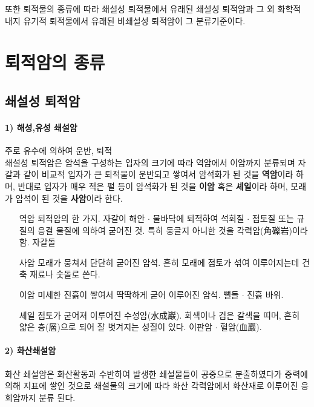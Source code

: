 \documentclass[12pt, a4paper, twoside]{book}
\begin{document}
		또한 퇴적물의 종류에 따라 쇄설성 퇴적물에서 유래된 쇄설성 퇴적암과 
		그 외 화학적 내지 유기적 퇴적물에서 유래된 비쇄설성 퇴적암이 그 분류기준이다.




	\clearpage
	\section{퇴적암의 종류}
	
	
				
		\subsection{쇄설성 퇴적암}


			\paragraph{1) 해성,유성 쇄설암}
				주로 유수에 의하여 운반, 퇴적 \\

				쇄설성 퇴적암은 암석을 구성하는 입자의 크기에 따라 역암에서 이암까지 분류되며 
				자갈과 같이 비교적 입자가 큰 퇴적물이 운반되고 쌓여서 암석화가 된 것을 \textbf{역암}이라 하며,
				반대로 입자가 매우 적은 펄 등이 암석화가 된 것을 \textbf{이암} 혹은 \textbf{셰일}이라 하며, 
				모래가 암석이 된 것을 \textbf{사암}이라 한다.

				\begin{itemize}[topsep=0.0em, parsep=0.0em, itemsep=0em, leftmargin=6.0em, labelwidth=3em, labelsep=3em] 
				\item [역암]	퇴적암의 한 가지. 자갈이 해안 $\cdot$ 물바닥에 퇴적하여 석회질 $\cdot$ 점토질 또는 규질의 응결 물질에 의하여 굳어진 것. 
							특히 둥글지 아니한 것을 각력암(角礫岩)이라 함. 자갈돌 
				\item [사암]  	모래가 뭉쳐서 단단히 굳어진 암석. 흔히 모래에 점토가 섞여 이루어지는데 건축 재료나 숫돌로 쓴다.
				\item [이암]  	미세한 진흙이 쌓여서 딱딱하게 굳어 이루어진 암석. 뻘돌 $\cdot$ 진흙 바위.
				\item [셰일] 	점토가 굳어져 이루어진 수성암(水成巖). 회색이나 검은 갈색을 띠며, 흔히 얇은 층(層)으로 되어 잘 벗겨지는 성질이 있다. 
							이판암 $\cdot$ 혈암(血巖).
				\end{itemize}
		

			\paragraph{2) 화산쇄설암} \tab \tab
					화산 쇄설암은 화산활동과 수반하여 발생한 쇄설물들이 공중으로 분출하였다가 중력에 의해 지표에 쌓인 것으로 
					쇄설물의 크기에 따라 화산 각력암에서 화산재로 이루어진 응회암까지 분류 된다.
\end{document}
